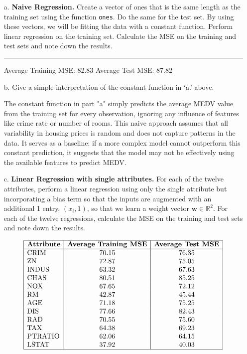 \documentclass{article}
\begin{document}
\begin{enumerate}
    \item[a.] \textbf{Naive Regression.} Create a vector of ones that is the same length as the training set using the function \texttt{ones}. Do the same for the test set. By using these vectors, we will be fitting the data with a constant function. Perform linear regression on the training set. Calculate the MSE on the training and test sets and note down the results.

    \noindent\textcolor{gray}{\rule{0.1\linewidth}{0.5pt}}
    
    \begin{enumerate}
        Average Training MSE: 82.83
        Average Test MSE: 87.82
    \end{enumerate}
    
    \item[b.] Give a simple interpretation of the constant function in `a.' above.

    The constant function in part "a" simply predicts the average MEDV value from the training set for every observation, ignoring any influence of features like crime rate or number of rooms. This naive approach assumes that all variability in housing prices is random and does not capture patterns in the data. It serves as a baseline: if a more complex model cannot outperform this constant prediction, it suggests that the model may not be effectively using the available features to predict MEDV.
    
    \item[c.] \textbf{Linear Regression with single attributes.} For each of the twelve attributes, perform a linear regression using only the single attribute but incorporating a bias term so that the inputs are augmented with an additional 1 entry, \((x_i, 1)\), so that we learn a weight vector \(\mathbf{w} \in \mathbb{R}^2\). For each of the twelve regressions, calculate the MSE on the training and test sets and note down the results.

    \[
    \begin{array}{|l|c|c|}
    \hline
    \textbf{Attribute} & \textbf{Average Training MSE} & \textbf{Average Test MSE} \\
    \hline
    \text{CRIM} & 70.15 & 76.35 \\
    \text{ZN} & 72.87 & 75.05 \\
    \text{INDUS} & 63.32 & 67.63 \\
    \text{CHAS} & 80.51 & 85.25 \\
    \text{NOX} & 67.65 & 72.12 \\
    \text{RM} & 42.87 & 45.44 \\
    \text{AGE} & 71.18 & 75.25 \\
    \text{DIS} & 77.66 & 82.43 \\
    \text{RAD} & 70.55 & 75.60 \\
    \text{TAX} & 64.38 & 69.23 \\
    \text{PTRATIO} & 62.06 & 64.15 \\
    \text{LSTAT} & 37.92 & 40.03 \\
    \hline
    \end{array}
    \]
    

\end{enumerate}
\end{document}
